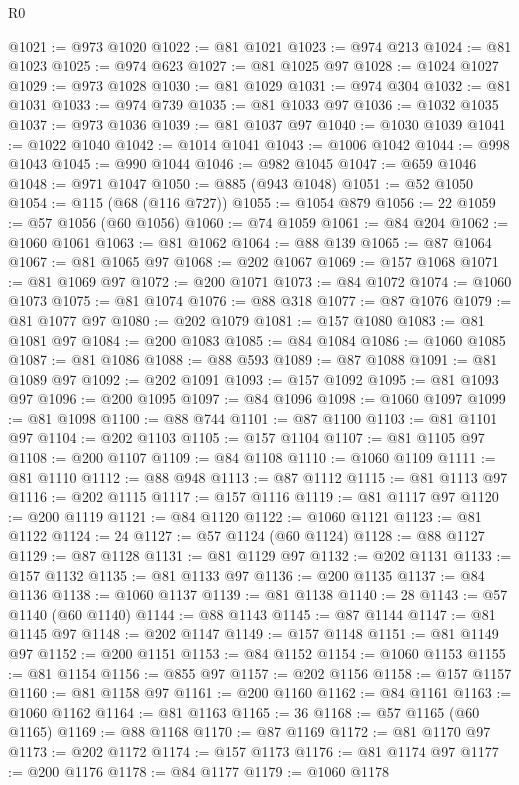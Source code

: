 \begin{lexlean}{R0}
\begin{coremodule}
@1021 := @973 @1020
@1022 := @81 @1021
@1023 := @974 @213
@1024 := @81 @1023
@1025 := @974 @623
@1027 := @81 @1025 @97
@1028 := @1024 @1027
@1029 := @973 @1028
@1030 := @81 @1029
@1031 := @974 @304
@1032 := @81 @1031
@1033 := @974 @739
@1035 := @81 @1033 @97
@1036 := @1032 @1035
@1037 := @973 @1036
@1039 := @81 @1037 @97
@1040 := @1030 @1039
@1041 := @1022 @1040
@1042 := @1014 @1041
@1043 := @1006 @1042
@1044 := @998 @1043
@1045 := @990 @1044
@1046 := @982 @1045
@1047 := @659 @1046
@1048 := @971 @1047
@1050 := @885 (@943 @1048)
@1051 := @52 @1050
@1054 := @115 (@68 (@116 @727))
@1055 := @1054 @879
@1056 := 22
@1059 := @57 @1056 (@60 @1056)
@1060 := @74 @1059
@1061 := @84 @204
@1062 := @1060 @1061
@1063 := @81 @1062
@1064 := @88 @139
@1065 := @87 @1064
@1067 := @81 @1065 @97
@1068 := @202 @1067
@1069 := @157 @1068
@1071 := @81 @1069 @97
@1072 := @200 @1071
@1073 := @84 @1072
@1074 := @1060 @1073
@1075 := @81 @1074
@1076 := @88 @318
@1077 := @87 @1076
@1079 := @81 @1077 @97
@1080 := @202 @1079
@1081 := @157 @1080
@1083 := @81 @1081 @97
@1084 := @200 @1083
@1085 := @84 @1084
@1086 := @1060 @1085
@1087 := @81 @1086
@1088 := @88 @593
@1089 := @87 @1088
@1091 := @81 @1089 @97
@1092 := @202 @1091
@1093 := @157 @1092
@1095 := @81 @1093 @97
@1096 := @200 @1095
@1097 := @84 @1096
@1098 := @1060 @1097
@1099 := @81 @1098
@1100 := @88 @744
@1101 := @87 @1100
@1103 := @81 @1101 @97
@1104 := @202 @1103
@1105 := @157 @1104
@1107 := @81 @1105 @97
@1108 := @200 @1107
@1109 := @84 @1108
@1110 := @1060 @1109
@1111 := @81 @1110
@1112 := @88 @948
@1113 := @87 @1112
@1115 := @81 @1113 @97
@1116 := @202 @1115
@1117 := @157 @1116
@1119 := @81 @1117 @97
@1120 := @200 @1119
@1121 := @84 @1120
@1122 := @1060 @1121
@1123 := @81 @1122
@1124 := 24
@1127 := @57 @1124 (@60 @1124)
@1128 := @88 @1127
@1129 := @87 @1128
@1131 := @81 @1129 @97
@1132 := @202 @1131
@1133 := @157 @1132
@1135 := @81 @1133 @97
@1136 := @200 @1135
@1137 := @84 @1136
@1138 := @1060 @1137
@1139 := @81 @1138
@1140 := 28
@1143 := @57 @1140 (@60 @1140)
@1144 := @88 @1143
@1145 := @87 @1144
@1147 := @81 @1145 @97
@1148 := @202 @1147
@1149 := @157 @1148
@1151 := @81 @1149 @97
@1152 := @200 @1151
@1153 := @84 @1152
@1154 := @1060 @1153
@1155 := @81 @1154
@1156 := @855 @97
@1157 := @202 @1156
@1158 := @157 @1157
@1160 := @81 @1158 @97
@1161 := @200 @1160
@1162 := @84 @1161
@1163 := @1060 @1162
@1164 := @81 @1163
@1165 := 36
@1168 := @57 @1165 (@60 @1165)
@1169 := @88 @1168
@1170 := @87 @1169
@1172 := @81 @1170 @97
@1173 := @202 @1172
@1174 := @157 @1173
@1176 := @81 @1174 @97
@1177 := @200 @1176
@1178 := @84 @1177
@1179 := @1060 @1178

\end{coremodule}
\end{lexlean}

